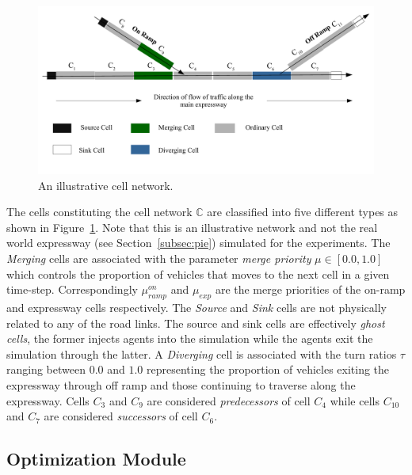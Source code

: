 \documentclass{wscpaperproc}
\theoremstyle{wsc}
\begin{document}
\begin{figure}[!htbp]
    \centering
    \includegraphics[scale=0.5]{images/cellNetwork.pdf}

    \caption{An illustrative cell network.}
    \label{fig:cell-network}
\end{figure}
  
The cells constituting the cell network $\mathbb{C}$ are classified into five different types as shown in Figure~\ref{fig:cell-network}. Note that this is an illustrative network and not the real world expressway (see Section~\ref{subsec:pie}) simulated for the experiments. The {\it Merging} cells are associated with the parameter {\it merge priority} $\mu\in [0.0,1.0]$ which controls the proportion of vehicles that moves to the next cell in a given time-step. Correspondingly $\mu^{on}_{ramp}$ and $\mu_{exp}$ are the merge priorities of the on-ramp and expressway cells respectively. The {\it Source} and {\it Sink} cells are not physically related to any of the road links. The source and sink cells are effectively {\it ghost cells}, the former injects agents into the simulation while the agents exit the simulation through the latter. A {\it Diverging} cell is associated with the turn ratios $\tau$ ranging between $0.0$ and $1.0$ representing the proportion of vehicles exiting the expressway through off ramp and those continuing to traverse along the expressway. Cells $C_3$ and $C_9$ are considered {\it predecessors} of cell $C_4$ while cells $C_{10}$ and $C_7$ are considered {\it successors} of cell $C_6$.

 \subsection{Optimization Module}
 \label{subsec:sim-anneal}
 
\end{document}
